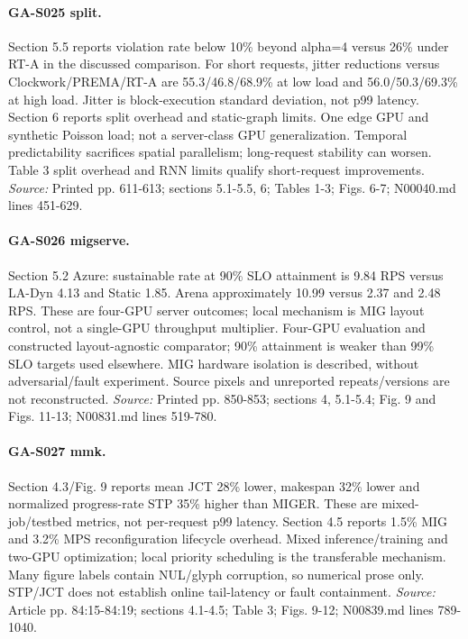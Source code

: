 \paragraph{GA-S025 split.} Section 5.5 reports violation rate below 10\% beyond alpha=4 versus 26\% under RT-A in the discussed comparison. For short requests, jitter reductions versus Clockwork/PREMA/RT-A are 55.3/46.8/68.9\% at low load and 56.0/50.3/69.3\% at high load. Jitter is block-execution standard deviation, not p99 latency. Section 6 reports split overhead and static-graph limits. One edge GPU and synthetic Poisson load; not a server-class GPU generalization. Temporal predictability sacrifices spatial parallelism; long-request stability can worsen. Table 3 split overhead and RNN limits qualify short-request improvements. \textit{Source:} Printed pp. 611-613; sections 5.1-5.5, 6; Tables 1-3; Figs. 6-7; N00040.md lines 451-629.

\paragraph{GA-S026 migserve.} Section 5.2 Azure: sustainable rate at 90\% SLO attainment is 9.84 RPS versus LA-Dyn 4.13 and Static 1.85. Arena approximately 10.99 versus 2.37 and 2.48 RPS. These are four-GPU server outcomes; local mechanism is MIG layout control, not a single-GPU throughput multiplier. Four-GPU evaluation and constructed layout-agnostic comparator; 90\% attainment is weaker than 99\% SLO targets used elsewhere. MIG hardware isolation is described, without adversarial/fault experiment. Source pixels and unreported repeats/versions are not reconstructed. \textit{Source:} Printed pp. 850-853; sections 4, 5.1-5.4; Fig. 9 and Figs. 11-13; N00831.md lines 519-780.

\paragraph{GA-S027 mmk.} Section 4.3/Fig. 9 reports mean JCT 28\% lower, makespan 32\% lower and normalized progress-rate STP 35\% higher than MIGER. These are mixed-job/testbed metrics, not per-request p99 latency. Section 4.5 reports 1.5\% MIG and 3.2\% MPS reconfiguration lifecycle overhead. Mixed inference/training and two-GPU optimization; local priority scheduling is the transferable mechanism. Many figure labels contain NUL/glyph corruption, so numerical prose only. STP/JCT does not establish online tail-latency or fault containment. \textit{Source:} Article pp. 84:15-84:19; sections 4.1-4.5; Table 3; Figs. 9-12; N00839.md lines 789-1040.

